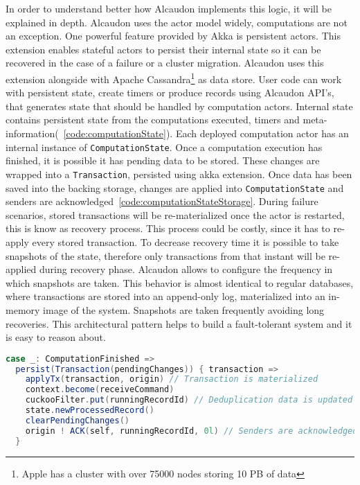 In order to understand better how Alcaudon implements this logic, it will be
explained in depth. Alcaudon uses the actor model widely, computations are not
an exception. One powerful feature provided by Akka is persistent actors. This
extension enables stateful actors to persist their internal state so it can be
recovered in the case of a failure or a cluster migration. Alcaudon uses this
extension alongside with Apache Cassandra\footnote{Apple has a cluster with over
  75000 nodes storing 10 PB of data} as data store. User code can work with
persistent state, create timers or produce records using Alcaudon \acs{API}'s,
that generates state that should be handled by computation actors. Internal
state contains persistent state from the computations executed, timers and
meta-information(~\ref{code:computationState}). Each
deployed computation actor has an internal instance of
\lstinline[columns=fixed]{ComputationState}. Once a computation execution has
finished, it is possible it has pending data to be stored. These changes are wrapped
into a \lstinline[columns=fixed]{Transaction}, persisted using akka extension.
Once data has been saved into the backing storage, changes are applied into
\lstinline[columns=fixed]{ComputationState} and senders are
acknowledged~\ref{code:computationStateStorage}. During failure scenarios, stored
transactions will be re-materialized once the actor is restarted, this is
know as recovery process. This process could be costly, since it has to re-apply
every stored transaction. To decrease recovery time it is possible to take
snapshots of the state, therefore only transactions from that instant will be
re-applied during recovery phase. Alcaudon allows to configure the frequency in
which snapshots are taken. This behavior is almost identical to regular
databases, where transactions are stored into an append-only log, materialized into an
in-memory image of the system. Snapshots are taken frequently avoiding long
recoveries. This architectural pattern helps to build a fault-tolerant system
and it is easy to reason about.

\begin{lstlisting}[language=scala, frame=trBL, label=code:computationStateStorage, float=ht, caption = {Computation state persistence}]
case _: ComputationFinished =>
  persist(Transaction(pendingChanges)) { transaction =>
    applyTx(transaction, origin) // Transaction is materialized
    context.become(receiveCommand)
    cuckooFilter.put(runningRecordId) // Deduplication data is updated
    state.newProcessedRecord()
    clearPendingChanges()
    origin ! ACK(self, runningRecordId, 0l) // Senders are acknowledged
  }
\end{lstlisting}

